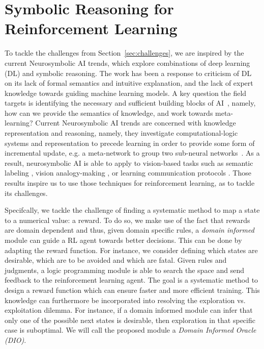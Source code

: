 \section{Symbolic Reasoning for Reinforcement Learning} 
\label{symrl}

To tackle the challenges from Section~\ref{sec:challenges}, we are
inspired by the current Neurosymbolic AI trends, which explore
combinations of deep learning (DL) and symbolic reasoning.
%
The work has been a response to criticism of DL on its lack of formal
semantics and intuitive explanation, and the lack of expert knowledge
towards guiding machine learning models.
%
A key question the field targets is identifying the necessary and
sufficient building blocks of AI~\cite{garcez2020neurosymbolic},
namely, how can we provide the semantics of knowledge, and work
towards meta-learning? 
%
Current Neurosymbolic AI trends are concerned with knowledge representation and reasoning, namely, they investigate computational-logic systems 
and representation to precede learning in order to provide some form
of incremental update, e.g. a meta-network to group two sub-neural
networks~\cite{Besold2017NeuralSymbolicLA}.
As a result, neurosymbolic AI is able to apply to vision-based tasks such as semantic labeling \cite{vinyals2015, karpathy2015}, 
vision analogy-making \cite{Reed2015DeepVA}, or learning communication
protocols \cite{Foerster2016LearningTC}. 
Those results inspire us to use those techniques for reinforcement learning, as to tackle its challenges.

\medskip
Specifcally, we tackle the challenge of finding a systematic method to map a state to a numerical value: a reward. 
To do so, we make use of the fact that rewards are domain dependent and thus, given domain specific rules, a \emph{domain informed} module can guide a RL agent towards better decisions. This can be done by 
adapting the reward function. For instance, we consider defining which states are desirable, which are to be avoided and which are fatal. Given rules and judgments, a logic programming module 
is able to search the space and send feedback to the reinforcement learning agent. The goal is a systematic method to design a reward function which can ensure faster and more efficient 
training. This knowledge can furthermore be incorporated into resolving the exploration vs. exploitation dilemma. For instance, if a domain informed module 
can infer that only one of the possible next states is desirable, then exploration in that specific case is suboptimal.  
We will call the proposed module a \emph{Domain Informed Oracle
(DIO)}. 

